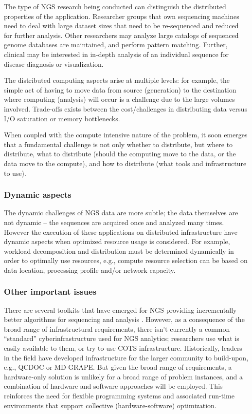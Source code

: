 The type of NGS research being conducted can distinguish the
distributed properties of the application. Researcher groups that
own sequencing machines need to deal with large dataset sizes that
need to be re-sequenced and reduced for further analysis. Other
researchers may analyze large catalogs of sequenced genome databases
are maintained, and perform pattern matching. Further, clinical may be
interested in in-depth analysis of an individual sequence for disease
diagnosis or visualization.

The distributed computing aspects arise at multiple levels: for
example, the simple act of having to move data from source
(generation) to the destination where computing (analysis) will occur
is a challenge due to the large volumes involved. Trade-offs exists
between the cost/challenges in distributing data versus I/O
saturation or memory bottlenecks.

When coupled with the compute intensive nature of the problem, it soon
emerges that a fundamental challenge is not only whether to
distribute, but where to distribute, what to distribute (should the
computing move to the data, or the data move to the compute), and how
to distribute (what tools and infrastructure to use).

\subsubsection*{Dynamic aspects}

The dynamic challenges of NGS data are more subtle; the data
themselves are not dynamic -- the sequences are acquired once and
analyzed many times. However the execution of these applications on
distributed infrastructure have dynamic aspects when optimized
resource usage is considered. For example, workload decomposition and
distribution must be determined dynamically in order to optimally use
resources, e.g., compute resource selection can be based on data
location, processing profile and/or network capacity.

\subsubsection*{Other important issues}

There are several toolkits that have emerged for NGS providing
incrementally better algorithms for sequencing and analysis
\cite{SAMtools, BioJava, BioPerl, .NETBio}.  However, as a consequence
of the broad range of infrastructural requirements, there isn't
currently a common ``standard'' cyberinfrastructure used for NGS
analytics; researchers use what is easily available to them, or try to
use COTS infrastructure. Historically, leaders in the field have
developed infrastructure for the larger community to build-upon, e.g.,
QCDOC or MD-GRAPE. But given the broad range of requirements, a
hardware-only solution is unlikely for a broad range of problem
instances, and a combination of hardware and software approaches will
be employed. This reinforces the need for flexible programming systems
and associated run-time environments that support collective
(hardware-software) optimization.

